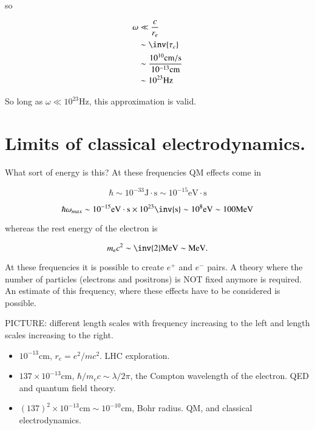 so 

\begin{align*}
\omega 
&\ll \frac{c}{r_e}  \\
&\sim \inv{\tau_e}  \\
&\sim \frac{ 10^{10} \text{cm}/\text{s}}{10^{-13} \text{cm}}  \\
&\sim 10^{23} \text{Hz} \\
\end{align*}

So long as $\omega \ll 10^{23} \text{Hz}$, this approximation is valid.

\section{Limits of classical electrodynamics.}

What sort of energy is this?  At these frequencies QM effects come in

\begin{equation}\label{eqn:relativisticElectrodynamicsL27:230}
\hbar \sim 10^{-33} \text{J} \cdot \text{s} \sim 10^{-15} \text{eV} \cdot \text{s}
\end{equation}

\begin{equation}\label{eqn:relativisticElectrodynamicsL27:250}
\hbar \omega_{max} \sim 
10^{-15} \text{eV} \cdot \text{s} \times 10^{23} \inv{\text{s}} \sim 10^8 \text{eV} \sim 100 \text{MeV}
\end{equation}

whereas the rest energy of the electron is 

\begin{equation}\label{eqn:relativisticElectrodynamicsL27:270}
m_e c^2 \sim \inv{2} \text{MeV} \sim \text{MeV}.
\end{equation}

At these frequencies it is possible to create $e^{+}$ and $e^{-}$ pairs.  A theory where the number of particles (electrons and positrons) is NOT fixed anymore is required.  An estimate of this frequency, where these effects have to be considered is possible.

PICTURE: different length scales with frequency increasing to the left and length scales increasing to the right.
 
\begin{itemize}
\item $10^{-13} \text{cm}$, $r_e = e^2/m c^2$.  LHC exploration.
\item $137 \times 10^{-13} \text{cm}$, $\hbar/m_e c \sim \lambda/2\pi$, the Compton wavelength of the electron.  QED and quantum field theory.
\item $(137)^2 \times 10^{-13}  \text{cm} \sim 10^{-10} \text{cm}$, Bohr radius.  QM, and classical electrodynamics.
\end{itemize}

